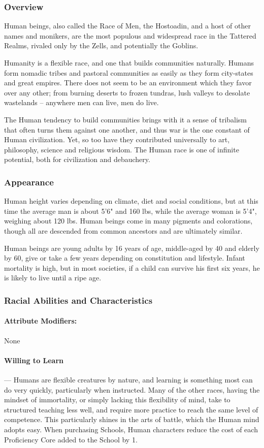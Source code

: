 \documentclass[oneside,11pt,english]{book}
\begin{document}
\subsubsection*{Overview}
Human beings, also called the Race of Men, the Hostoadin, and a host of other names and monikers, are the most populous and widespread race in the Tattered Realms, rivaled only by the Zells, and potentially the Goblins. 


Humanity is a flexible race, and one that builds communities naturally. Humans form nomadic tribes and 
pastoral communities as easily as they form city-states and great empires. There does not seem to be an 
environment which they favor over any other; from burning deserts to frozen tundras, lush valleys to 
desolate wastelands -- anywhere men can live, men do live.


The Human tendency to build communities brings with it a sense of tribalism that often turns them 
against one another, and thus war is the one constant of Human civilization. Yet, so too have they 
contributed universally to art, philosophy, science and religious wisdom. The Human race is one of 
infinite potential, both for civilization and debauchery. 
 

\subsubsection*{Appearance} 
Human height varies depending on climate, diet and social conditions, but at this time the average man is about 5'6" and 160 lbs, while the average woman is 5'4", weighing about 120 lbs. Human beings come in many pigments and colorations, though all are descended from common ancestors and are ultimately 
similar.


Human beings are young adults by 16 years of age, middle-aged by 40 and elderly by 60, give or take a 
few years depending on constitution and lifestyle. Infant mortality is high, but in most societies, if a child can survive his first six years, he is likely to live until a ripe age.


\subsubsection*{Racial Abilities and Characteristics} 
\paragraph{Attribute Modifiers:} None\\
\paragraph{\label{par:Willing to Learn}Willing to Learn}---\quad
Humans are flexible creatures by nature, and learning is something most can do very quickly, 
particularly when instructed. Many of the other races, having the mindset of immortality, or 
simply lacking this flexibility of mind, take to structured teaching less well, and require more 
practice to reach the same level of competence. This particularly shines in the arts of battle, which 
the Human mind adopts easy. When purchasing Schools, Human characters reduce the cost of 
each Proficiency Core added to the School by 1. 
\end{document}
